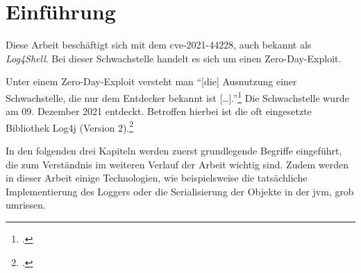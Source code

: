 
\section{Einführung}\label{sec:einfuhrung}
Diese Arbeit beschäftigt sich mit dem \gls{cve}-2021-44228, auch bekannt als \textit{Log4Shell}.
Bei dieser Schwachstelle handelt es sich um einen Zero-Day-Exploit.

Unter einem Zero-Day-Exploit versteht man ``[die] Ausnutzung einer Schwachstelle, die nur dem Entdecker bekannt ist [\ldots].''\footcite{bsizeroday}
Die Schwachstelle wurde am 09. Dezember 2021 entdeckt.
Betroffen hierbei ist die oft eingesetzte Bibliothek Log4j (Version 2).\footcite{lunasec}

In den folgenden drei Kapiteln werden zuerst grundlegende Begriffe eingeführt, die zum Verständnis im weiteren Verlauf der Arbeit wichtig sind.
Zudem werden in dieser Arbeit einige Technologien, wie beispielsweise die tatsächliche Implementierung des Loggers oder die Serialisierung der Objekte in der \gls{jvm}, grob umrissen.




